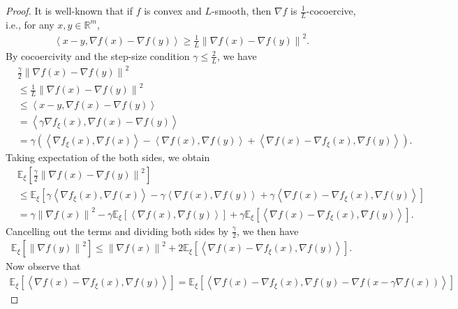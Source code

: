 \documentclass{article}
\newcommand{\reals}{\mathbb{R}}
\newcommand{\inprod}[2]{\left\langle #1,#2 \right\rangle}
\newcommand{\sqnorm}[1]{\left\| #1 \right\|^2}
\theoremstyle{plain}
\theoremstyle{remark}
\begin{document}
\begin{proof}

It is well-known that if $f$ is convex and $L$-smooth, then $\nabla f$ is $\frac{1}{L}$-cocoercive, i.e., for any $x,y \in \reals^m$,
\begin{align*}
    \inprod{x-y}{\nabla f(x)-\nabla f(y)} \ge \frac{1}{L} \sqnorm{\nabla f(x) - \nabla f(y)} .
\end{align*}
By cocoercivity and the step-size condition $\gamma \le \frac{2}{L}$, we have
\begin{align*}
    & \frac{\gamma}{2} \sqnorm{\nabla f(x) - \nabla f(y)} \\
    & \le \frac{1}{L} \sqnorm{\nabla f(x) - \nabla f(y)} \\
    & \le \inprod{x-y}{\nabla f(x)-\nabla f(y)} \\
    & = \inprod{\gamma\nabla f_\xi(x)}{\nabla f(x) - \nabla f(y)} \\
    & = \gamma \left( \inprod{\nabla f_\xi(x)}{\nabla f(x)} - \inprod{\nabla f(x)}{\nabla f(y)} + \inprod{\nabla f(x) - \nabla f_\xi(x)}{\nabla f(y)} \right) .
\end{align*}
Taking expectation of the both sides, we obtain
\begin{align*}
    & \mathbb{E}_\xi \left[ \frac{\gamma}{2} \sqnorm{\nabla f(x) - \nabla f(y)} \right] \\
    & \le \mathbb{E}_\xi \left[ \gamma \inprod{\nabla f_\xi(x)}{\nabla f(x)} - \gamma \inprod{\nabla f(x)}{\nabla f(y)} + \gamma \inprod{\nabla f(x) - \nabla f_\xi(x)}{\nabla f(y)} \right] \\
    & = \gamma \sqnorm{\nabla f(x)} - \gamma \mathbb{E}_\xi \left[ \inprod{\nabla f(x)}{\nabla f(y)} \right] + \gamma \mathbb{E}_\xi \left[ \inprod{\nabla f(x) - \nabla f_\xi(x)}{\nabla f(y)} \right] .
\end{align*}
Cancelling out the terms and dividing both sides by $\frac{\gamma}{2}$, we then have
\begin{align}
\label{eqn:stochastic-descent-lemma-key-equation}
    \mathbb{E}_\xi \left[ \sqnorm{\nabla f(y)} \right] \le \sqnorm{\nabla f(x)} + 2 \mathbb{E}_\xi \left[ \inprod{\nabla f(x) - \nabla f_\xi(x)}{\nabla f(y)} \right] .
\end{align}
Now observe that 
\begin{align*}
    \mathbb{E}_\xi \left[ \inprod{\nabla f(x) - \nabla f_\xi(x)}{\nabla f(y)} \right] = \mathbb{E}_\xi \left[ \inprod{\nabla f(x) - \nabla f_\xi(x)}{\nabla f(y) - \nabla f(x - \gamma\nabla f(x))} \right]
\end{align*}

\end{proof}
\end{document}
